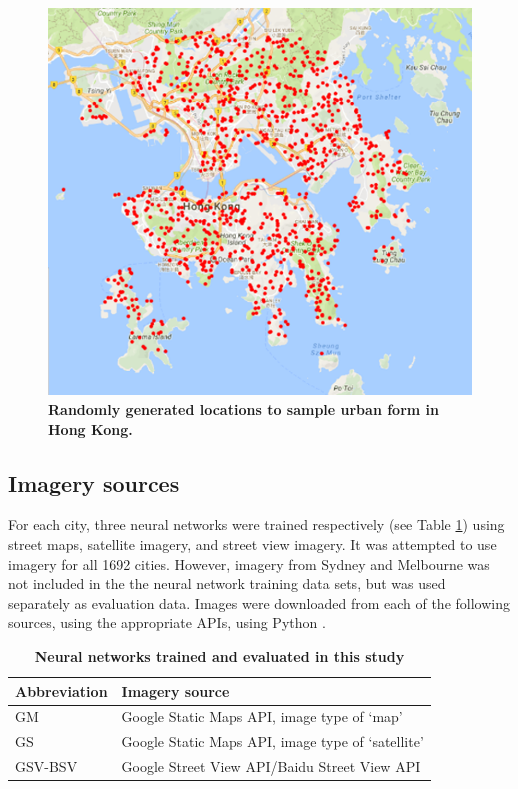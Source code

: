 \documentclass[10pt,letterpaper]{article}
\begin{document}
\begin{figure}[!htbp] 
    \centering    
\includegraphics[scale=0.5]{Images/PlosOne/Fig1.png} 
\caption{\bf Randomly generated locations to sample urban form in Hong Kong.} 
\label{fig:hongkong}  
\end{figure}


\label{methodsimagery}
\subsection*{Imagery sources}


For each city, three neural networks were trained respectively (see Table \ref{tab:neuralnetworks}) using street maps, satellite imagery, and street view imagery. It was attempted to use imagery for all 1692 cities. However, imagery from Sydney and Melbourne was not included in the the neural network training data sets, but was used separately as evaluation data. Images were downloaded from each of the following sources, using the appropriate APIs, using Python \cite{Python2016}.


\begin{table}[!htbp]
\caption{\bf Neural networks trained and evaluated in this study \label{tab:neuralnetworks}}     
\begin{tabular}{ l l }
 \hline Abbreviation   &  Imagery source \\ \hline
GM & Google Static Maps API, image type of `map'     \\ 
GS & Google Static Maps API, image type of `satellite'      \\
GSV-BSV & Google Street View API/Baidu Street View API     \\ \hline

\end{tabular}
\end{table}
\end{document}
